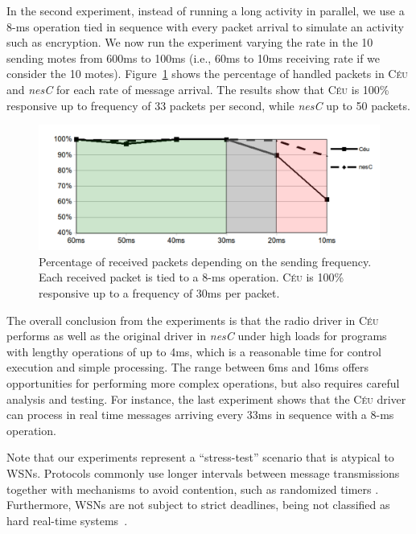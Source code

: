 \documentclass[letterpaper]{sig-alternate}
\newcommand{\CEU}{\textsc{C\'{e}u}\xspace}
\begin{document}
In the second experiment, instead of running a long activity in parallel, we 
use a 8-ms operation tied in sequence with every packet arrival to simulate an 
activity such as encryption.
We now run the experiment varying the rate in the 10 sending motes from 600ms 
to 100ms (i.e., 60ms to 10ms receiving rate if we consider the 10 motes).
%
Figure~\ref{fig.radio2} shows the percentage of handled packets in \CEU and 
\emph{nesC} for each rate of message arrival.
%
%
The results show that \CEU is 100\% responsive up to frequency of 33 packets 
per second, while \emph{nesC} up to 50 packets.

\begin{figure}[t]
\includegraphics[width=\linewidth,clip=true,trim=35px 0px 10px 0px]{radio2}
\caption{  Percentage of received packets depending on the sending frequency.  
\newline
{\small %
Each received packet is tied to a 8-ms operation.
\CEU is 100\% responsive up to a frequency of 30ms per packet.
}%
\label{fig.radio2}
}
\end{figure}


The overall conclusion from the experiments is that the radio driver in \CEU 
performs as well as the original driver in \emph{nesC} under high loads for 
programs with lengthy operations of up to 4ms, which is a reasonable time for 
control execution and simple processing.
%
The range between 6ms and 16ms offers opportunities for performing more complex 
operations, but also requires careful analysis and testing.
%
For instance, the last experiment shows that the \CEU driver can process in 
real time messages arriving every 33ms in sequence with a 8-ms operation.
%

Note that our experiments represent a ``stress-test'' scenario that is atypical 
to WSNs.
Protocols commonly use longer intervals between message transmissions together 
with mechanisms to avoid contention, such as randomized 
timers \cite{wsn.trickle,wsn.ctp}.
Furthermore, WSNs are not subject to strict deadlines, being not classified as 
hard real-time systems~\cite{wsn.decade}.
\end{document}
